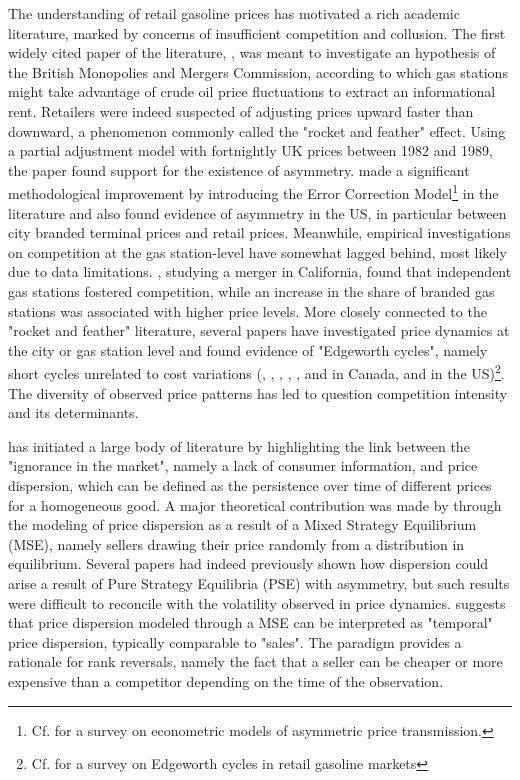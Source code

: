 \documentclass[english]{article}
\begin{document}
The understanding of retail gasoline prices has motivated a rich academic literature, marked by concerns of insufficient competition and collusion. The first widely cited paper of the literature, \cite{BAC91}, was meant to investigate an hypothesis of the British Monopolies and Mergers Commission, according to which gas stations might take advantage of crude oil price fluctuations to extract an informational rent. Retailers were indeed suspected of adjusting prices upward faster than downward, a phenomenon commonly called the "rocket and feather" effect. Using a partial adjustment model with fortnightly UK prices between 1982 and 1989, the paper found support for the existence of asymmetry. \cite{BOR97} made a significant methodological improvement by introducing the Error Correction Model\footnote{Cf. \cite{FRE07} for a survey on econometric models of asymmetric price transmission.} in the literature and also found evidence of asymmetry in the US, in particular between city branded terminal prices and retail prices. Meanwhile, empirical investigations on competition at the gas station-level have somewhat lagged behind, most likely due to data limitations. \cite{HAS04}, studying a merger in California, found that independent gas stations fostered competition, while an increase in the share of branded gas stations was associated with higher price levels. More closely connected to the "rocket and feather" literature, several papers have investigated price dynamics at the city or gas station level and found evidence of "Edgeworth cycles", namely short cycles unrelated to cost variations (\cite{ECK02}, \cite{ECK03}, \cite{ECK04a}, \cite{ECK04b}, \cite{NOE07a}, \cite{NOE07b} and \cite{NOE08} in Canada, \cite{LEW09} and \cite{LEW11a} in the US)\footnote{Cf. \cite{ECK13} for a survey on Edgeworth cycles in retail gasoline markets}. The diversity of observed price patterns has led to question competition intensity and its determinants.

\cite{STI61} has initiated a large body of literature by highlighting the link between the "ignorance in the market", namely a lack of consumer information, and price dispersion, which can be defined as the persistence over time of different prices for a homogeneous good. A major theoretical contribution was made by \cite{VAR80} through the modeling of price dispersion as a result of a Mixed Strategy Equilibrium (MSE), namely sellers drawing their price randomly from a distribution in equilibrium. Several papers had indeed previously shown how dispersion could arise a result of Pure Strategy Equilibria (PSE) with asymmetry, but such results were difficult to reconcile with the volatility observed in price dynamics. \cite{VAR80} suggests that price dispersion modeled through a MSE can be interpreted as "temporal" price dispersion, typically comparable to "sales". The \cite{VAR80} paradigm provides a rationale for rank reversals, namely the fact that a seller can be cheaper or more expensive than a competitor depending on the time of the observation.
\end{document}
